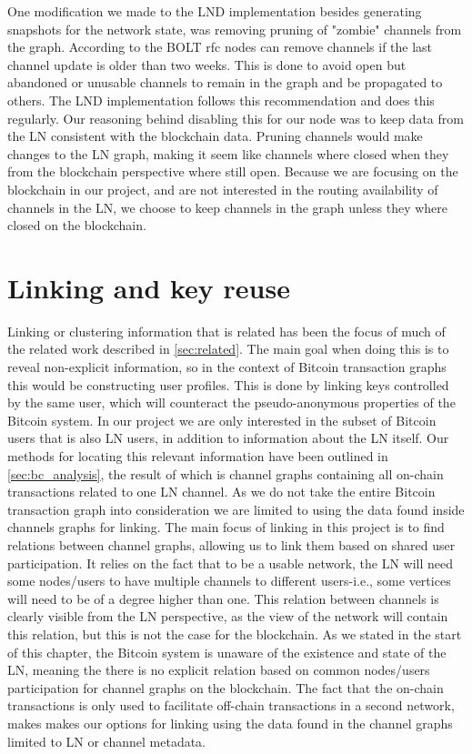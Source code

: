 One modification we made to the LND implementation besides generating snapshots for the network state, was removing pruning of "zombie" channels from the graph. According to the BOLT rfc \cite{bolt7} nodes can remove channels if the last channel update is older than two weeks. This is done to avoid open but abandoned or unusable channels to remain in the graph and be propagated to others. The LND implementation follows this recommendation and does this regularly. Our reasoning behind disabling this for our node was to keep data from the LN consistent with the blockchain data. Pruning channels would make changes to the LN graph, making it seem like channels where closed when they from the blockchain perspective where still open. Because we are focusing on the blockchain in our project, and are not interested in the routing availability of channels in the LN, we choose to keep channels in the graph unless they where closed on the blockchain.

\section{Linking and key reuse}
\label{sec:linking}

Linking or clustering information that is related has been the focus of much of the related work described in \cref{sec:related}. The main goal when doing this is to reveal non-explicit information, so in the context of Bitcoin transaction graphs this would be constructing user profiles. 
This is done by linking keys controlled by the same user, which will counteract the pseudo-anonymous properties of the Bitcoin system. In our project we are only interested in the subset of Bitcoin users that is also LN users, in addition to information about the LN itself. 
Our methods for locating this relevant information have been outlined in \cref{sec:bc_analysis}, the result of which is channel graphs containing all on-chain transactions related to one LN channel. 
As we do not take the entire Bitcoin transaction graph into consideration we are limited to using the data found inside channels graphs for linking.  
The main focus of linking in this project is to find relations between channel graphs, allowing us to link them based on shared user participation.
It relies on the fact that to be a usable network, the LN will need some nodes/users to have multiple channels to different users-i.e., some vertices will need to be of a degree higher than one. This relation between channels is clearly visible from the LN perspective, as the view of the network will contain this relation, but this is not the case for the blockchain. As we stated in the start of this chapter, the Bitcoin system is unaware of the existence and state of the LN, meaning the there is no explicit relation based on common nodes/users participation for channel graphs on the blockchain. The fact that the on-chain transactions is only used to facilitate off-chain transactions in a second network, makes makes our options for linking using the data found in the channel graphs limited to LN or channel metadata.
\\

